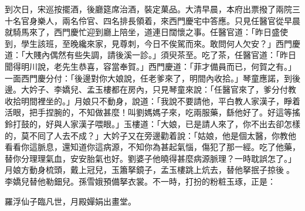 到次日，宋巡按擺酒，後廳筵席治酒，裝定菓品。大清早晨，本府出票撥了兩院三十名官身樂人，兩名伶官、四名排長領着，來西門慶宅中答應。只見任醫官從早晨就騎馬來了，西門慶忙迎到廳上陪坐，道連日闊懷之事。任醫官道：「昨日盛使到，學生該班，至晚纔來家，見尊刺，今日不俟駕而來。敢問何人欠安？」西門慶道：「大賤內偶然有些失調，請後溪一診。」須臾茶至。吃了茶，任醫官道：「昨日聞得明川說，老先生恭喜，容當奉賀。」西門慶道：「菲才備員而已，何賀之有。」一面西門慶分付：「後邊對你大娘說，任老爹來了，明間內收拾。」琴童應諾，到後邊。大妗子、李嬌兒、孟玉樓都在房內，只見琴童來說：「任醫官來了，爹分付教收拾明間裡坐的。」月娘只不動身，說道：「我說不要請他，平白教人家漢子，睜着活眼，把手捏腕的，不知做甚麼！叫劉媽媽子來，吃兩服藥，繇他好了。好這等搖鈴打鼓的，好與人家漢子喂眼。」玉樓道：「大娘，已是請人來了，你不出去卻怎樣的，莫不囘了人去不成？」大妗子又在旁邊勸着說：「姑娘，他是個太醫，你教他看看你這脈息，還知道你這病源，不知你為甚起氣惱，傷犯了那一經。吃了他藥，替你分理理氣血，安安胎氣也好。劉婆子他曉得甚麼病源脈理？一時耽誤怎了。」月娘方動身梳頭，戴上冠兒，玉簫拏鏡子，孟玉樓跳上炕去，替他拏抿子掠後𩬆。李嬌兒替他勒鈿兒。孫雪娥預備拏衣裳。{}不一時，打扮的粉粧玉琢，正是：

羅浮仙子臨凡世，月殿嬋娟出畫堂。


